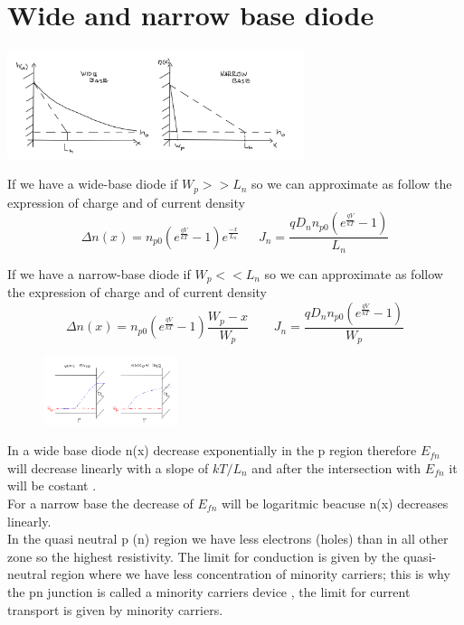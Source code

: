 \section{Wide and narrow base diode}

\centering
\includegraphics[width=0.65\textwidth]{pn12.png}\\
\raggedright

If we have a wide-base diode if $W_p>>L_n$ so we can approximate as follow the expression of charge and of current density 
\begin{equation}
\Delta n(x)=n_{p0}(e^{\frac{qV}{kT}}-1)e^{\frac{-x}{L_n}} \ \ \ \ \ \ \ J_n=\frac{qD_nn_{p0}(e^{\frac{qV}{kT}}-1)}{L_n}
\end{equation}


If we have a narrow-base diode if $W_p<<L_n$ so we can approximate as follow the expression of charge and of current density
\begin{equation}
\Delta n(x)=n_{p0}(e^{\frac{qV}{kT}}-1)\frac{W_p-x}{W_p}\ \ \ \ \ \ \ \ \ J_n=\frac{qD_nn_{p0}(e^{\frac{qV}{kT}}-1)}{W_p}
\end{equation}


\begin{figure}
\includegraphics[width=0.35\textwidth]{wbnb.png}
\end{figure}

In a wide base diode n(x) decrease exponentially in the p region therefore $E_{fn}$ will decrease linearly with a slope of $kT/L_n$ and after the intersection with $E_{fn}$ it will be costant .\\
For a narrow base the decrease of $E_{fn}$ will be logaritmic beacuse n(x) decreases linearly.\\
In the quasi neutral p (n) region we have less electrons (holes) than in all other zone so the highest resistivity. The limit for conduction is given by the quasi-neutral region where we have less concentration of minority carriers; this is why the pn junction is called a minority carriers device , the limit for current transport is given by minority carriers.\\
\vspace{5mm}

